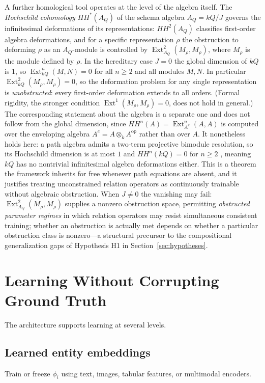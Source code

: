 \documentclass[11pt]{article}
\newcommand{\Ext}{\operatorname{Ext}}
\begin{document}
A further homological tool operates at the level of the algebra itself. The \emph{Hochschild cohomology} $HH^*(A_Q)$ of the schema algebra $A_Q=kQ/J$ governs the infinitesimal deformations of its representations: $HH^2(A_Q)$ classifies first-order algebra deformations, and for a specific representation $\rho$ the obstruction to deforming $\rho$ as an $A_Q$-module is controlled by $\Ext^2_{A_Q}(M_\rho,M_\rho)$, where $M_\rho$ is the module defined by $\rho$. In the hereditary case $J=0$ the global dimension of $kQ$ is $1$, so $\Ext^n_{kQ}(M,N)=0$ for all $n\ge2$ and all modules $M,N$. In particular $\Ext^2_{kQ}(M_\rho,M_\rho)=0$, so the deformation problem for any single representation is \emph{unobstructed}: every first-order deformation extends to all orders. (Formal rigidity, the stronger condition $\Ext^1(M_\rho,M_\rho)=0$, does not hold in general.) The corresponding statement about the algebra is a separate one and does not follow from the global dimension, since $HH^n(A)=\Ext^n_{A^e}(A,A)$ is computed over the enveloping algebra $A^e=A\otimes_k A^{\mathrm{op}}$ rather than over $A$. It nonetheless holds here: a path algebra admits a two-term projective bimodule resolution, so its Hochschild dimension is at most $1$ and $HH^n(kQ)=0$ for $n\ge2$ \citep{happel1989}, meaning $kQ$ has no nontrivial infinitesimal algebra deformations either. This is a theorem the framework inherits for free whenever path equations are absent, and it justifies treating unconstrained relation operators as continuously trainable without algebraic obstruction. When $J\neq0$ the vanishing may fail: $\Ext^2_{A_Q}(M_\rho,M_\rho)$ supplies a nonzero obstruction space, permitting \emph{obstructed parameter regimes} in which relation operators may resist simultaneous consistent training; whether an obstruction is actually met depends on whether a particular obstruction class is nonzero---a structural precursor to the compositional generalization gaps of Hypothesis H1 in Section~\ref{sec:hypotheses}.

\section{Learning Without Corrupting Ground Truth}

The architecture supports learning at several levels.

\subsection{Learned entity embeddings}
Train or freeze $\phi_i$ using text, images, tabular features, or multimodal encoders.
\end{document}
